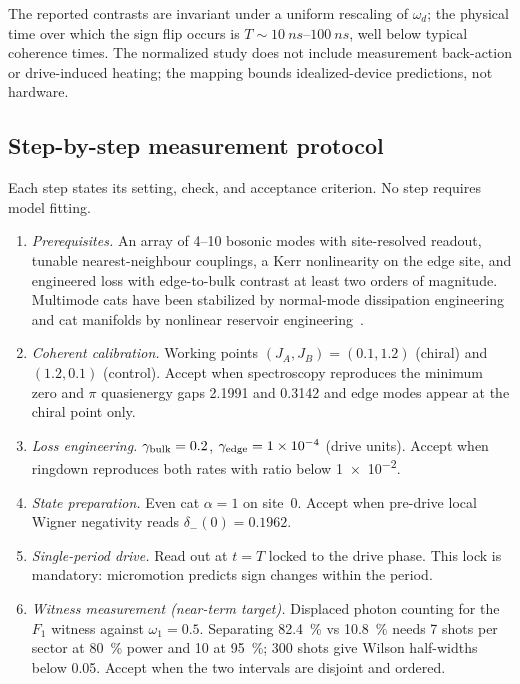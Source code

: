 \documentclass[aps,pra,preprint,superscriptaddress,amsmath,amssymb]{revtex4-2}
\begin{document}
The reported contrasts are invariant under a uniform rescaling of $\omega_d$; the physical time over which the sign flip occurs is $T\sim\qtyrange{10}{100}{ns}$, well below typical coherence times. The normalized study does not include measurement back-action or drive-induced heating; the mapping bounds idealized-device predictions, not hardware.

\subsection{Step-by-step measurement protocol}
\label{sec:measurement-protocol}

Each step states its setting, check, and acceptance criterion. No step requires model fitting.

\begin{enumerate}
\item \emph{Prerequisites.} An array of \num{4}--\num{10} bosonic modes with site-resolved readout, tunable nearest-neighbour couplings, a Kerr nonlinearity on the edge site, and engineered loss with edge-to-bulk contrast at least two orders of magnitude. Multimode cats have been stabilized by normal-mode dissipation engineering~\cite{Zapletal2022multimode} and cat manifolds by nonlinear reservoir engineering~\cite{Rojkov2026catmanifolds}.
\item \emph{Coherent calibration.} Working points $(J_A,J_B)=(\num{0.1},\num{1.2})$ (chiral) and $(\num{1.2},\num{0.1})$ (control). Accept when spectroscopy reproduces the minimum zero and $\pi$ quasienergy gaps \num{2.1991} and \num{0.3142} and edge modes appear at the chiral point only.
\item \emph{Loss engineering.} $\gamma_{\rm bulk}=\num{0.2}$, $\gamma_{\rm edge}=\num{1e-4}$ (drive units). Accept when ringdown reproduces both rates with ratio below \num{1e-2}.
\item \emph{State preparation.} Even cat $\alpha=\num{1}$ on site~\num{0}. Accept when pre-drive local Wigner negativity reads $\delta_-(\num{0})=\num{0.1962}$.
\item \emph{Single-period drive.} Read out at $t=T$ locked to the drive phase. This lock is mandatory: micromotion predicts sign changes within the period.
\item \emph{Witness measurement (near-term target).} Displaced photon counting for the $F_1$ witness against $\omega_1=\num{0.5}$. Separating \qty{82.4}{\percent} vs \qty{10.8}{\percent} needs \num{7} shots per sector at \qty{80}{\percent} power and \num{10} at \qty{95}{\percent}; \num{300} shots give Wilson half-widths below \num{0.05}. Accept when the two intervals are disjoint and ordered.

\end{enumerate}
\end{document}
